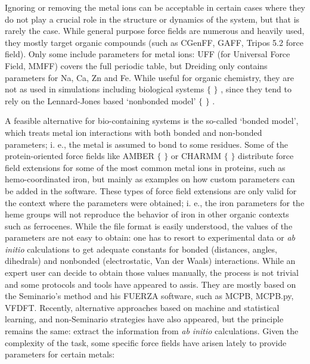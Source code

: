 Ignoring or removing the metal ions can be acceptable in certain cases where they do not play a crucial role in the structure or dynamics of the system, but that is rarely the case. While general purpose force fields are numerous and heavily used, they mostly target organic compounds (such as CGenFF,\cite{Vanommeslaeghe2009} GAFF,\cite{Wang2004} Tripos 5.2 force field\cite{clark1989}). Only some include parameters for metal ions: UFF (for Universal Force Field,\cite{rappe1992} MMFF\cite{halgren1996}) covers the full periodic table, but Dreiding\cite{Mayo1990} only contains parameters for Na, Ca, Zn and Fe. While useful for organic chemistry, they are not as used in simulations including biological systems $ \{ $ $ \} $ , since they tend to rely on the Lennard-Jones based ‘nonbonded model’ $ \{ $ $ \} $ .

A feasible alternative for bio-containing systems is the so-called ‘bonded model’, which treats metal ion interactions with both bonded and non-bonded parameters; i. e., the metal is assumed to bond to some residues. Some of the protein-oriented force fields like AMBER $ \{ $ $ \} $  or CHARMM $ \{ $ $ \} $  distribute force field extensions for some of the most common metal ions in proteins, such as hemo-coordinated iron, but mainly as examples on how custom parameters can be added in the software. These types of force field extensions are only valid for the context where the parameters were obtained; i. e., the iron parameters for the heme groups will not reproduce the behavior of iron in other organic contexts such as ferrocenes. While the file format is easily understood, the values of the parameters are not easy to obtain: one has to resort to experimental data or \textit{ab initio} calculations to get adequate constants for bonded (distances, angles, dihedrals) and nonbonded (electrostatic, Van der Waals) interactions. While an expert user can decide to obtain those values manually, the process is not trivial and some protocols and tools have appeared to assis. They are mostly based on the Seminario’s method and his FUERZA software, \cite{Seminario1996} such as MCPB, MCPB.py,\cite{li2016} VFDFT.\cite{zheng2016} Recently, alternative approaches based on machine and statistical learning, \cite{fracchia2017,li2017b} and non-Seminario strategies\cite{Burger2012, allen2017} have also appeared, but the principle remains the same: extract the information from \textit{ab initio} calculations. Given the complexity of the task, some specific force fields have arisen lately to provide parameters for certain metals:


